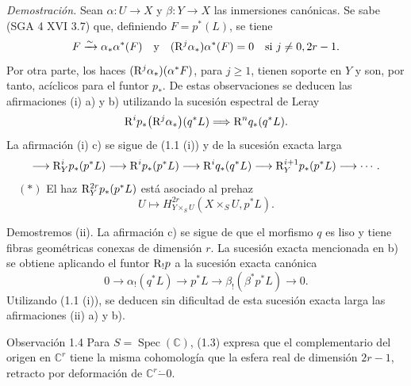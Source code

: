 \emph{Demostración.} Sean $\alpha:U\to X$ y $\beta:Y\to X$ las inmersiones canónicas. Se sabe (SGA 4 XVI 3.7) que, definiendo $F=p^*(L)$, se tiene
\[
F\xrightarrow{\sim}\alpha_*\alpha^*(F)
\quad\text{y}\quad
(\mathrm{R}^j\alpha_*)\alpha^*(F)=0\quad\text{si }j\ne0,2r-1.
\]
Por otra parte, los haces $(\mathrm{R}^j\alpha_*)(\alpha^*F)$, para $j\ge1$, tienen soporte en $Y$ y son, por tanto, acíclicos para el funtor $p_*$. De estas observaciones se deducen las afirmaciones (i) a) y b) utilizando la sucesión espectral de Leray
\[
\mathrm{R}^i p_*\bigl(\mathrm{R}^j\alpha_*\bigr)(q^*L)\Longrightarrow \mathrm{R}^n q_*(q^*L).
\]
La afirmación (i) c) se sigue de (1.1 (i)) y de la sucesión exacta larga
\[
\longrightarrow \mathrm{R}_Y^i p_*(p^*L)\longrightarrow \mathrm{R}^i p_*(p^*L)\longrightarrow \mathrm{R}^i q_*(q^*L)
\longrightarrow \mathrm{R}_Y^{i+1}p_*(p^*L)\longrightarrow\cdots.
\]
\(\quad (*)\) El haz $\mathrm{R}_Y^{2r}p_*(p^*L)$ está asociado al prehaz
\[
U\longmapsto H^{2r}_{Y\times_S U}(X\times_S U,p^*L).
\]

Demostremos (ii). La afirmación c) se sigue de que el morfismo $q$ es liso y tiene fibras geométricas conexas de dimensión $r$. La sucesión exacta mencionada en b) se obtiene aplicando el funtor $\mathrm{R}_!p$ a la sucesión exacta canónica
\[
0\longrightarrow \alpha_!(q^*L)\longrightarrow p^*L\longrightarrow \beta_!(\beta^*p^*L)\longrightarrow 0.
\]
Utilizando (1.1 (i)), se deducen sin dificultad de esta sucesión exacta larga las afirmaciones (ii) a) y b).

\begin{statement}{Observación 1.4}
Para $S=\operatorname{Spec}(\mathbb C)$, (1.3) expresa que el complementario del origen en $\mathbb C^r$ tiene la misma cohomología que la esfera real de dimensión $2r-1$, retracto por deformación de $\mathbb C^r\mathbin{\dot{-}}0$.
\end{statement}
